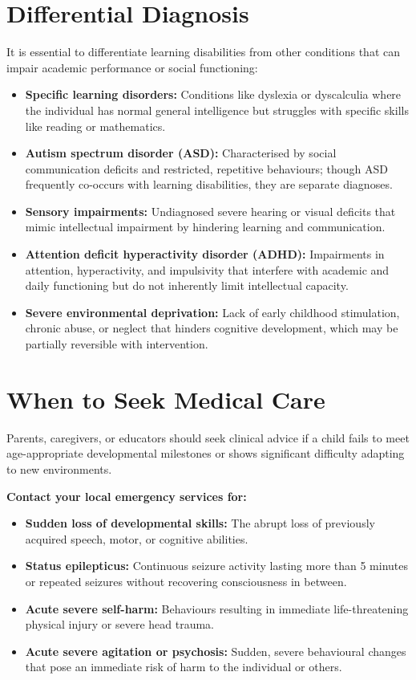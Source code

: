 \section*{Differential Diagnosis}
It is essential to differentiate learning disabilities from other conditions that can impair academic performance or social functioning:
\begin{itemize}
    \item \textbf{Specific learning disorders:} Conditions like dyslexia or dyscalculia where the individual has normal general intelligence but struggles with specific skills like reading or mathematics.
    \item \textbf{Autism spectrum disorder (ASD):} Characterised by social communication deficits and restricted, repetitive behaviours; though ASD frequently co-occurs with learning disabilities, they are separate diagnoses.
    \item \textbf{Sensory impairments:} Undiagnosed severe hearing or visual deficits that mimic intellectual impairment by hindering learning and communication.
    \item \textbf{Attention deficit hyperactivity disorder (ADHD):} Impairments in attention, hyperactivity, and impulsivity that interfere with academic and daily functioning but do not inherently limit intellectual capacity.
    \item \textbf{Severe environmental deprivation:} Lack of early childhood stimulation, chronic abuse, or neglect that hinders cognitive development, which may be partially reversible with intervention.
\end{itemize}

\section*{When to Seek Medical Care}
Parents, caregivers, or educators should seek clinical advice if a child fails to meet age-appropriate developmental milestones or shows significant difficulty adapting to new environments.

\textbf{Contact your local emergency services for:}
\begin{itemize}
    \item \textbf{Sudden loss of developmental skills:} The abrupt loss of previously acquired speech, motor, or cognitive abilities.
    \item \textbf{Status epilepticus:} Continuous seizure activity lasting more than 5 minutes or repeated seizures without recovering consciousness in between.
    \item \textbf{Acute severe self-harm:} Behaviours resulting in immediate life-threatening physical injury or severe head trauma.
    \item \textbf{Acute severe agitation or psychosis:} Sudden, severe behavioural changes that pose an immediate risk of harm to the individual or others.
\end{itemize}

